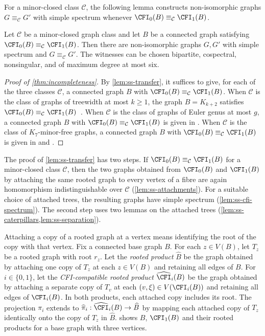 For a minor-closed class $\mathcal C$, the following lemma constructs
non-isomorphic graphs $G\equiv_{\mathcal C}G'$ with simple spectrum
whenever $\CFI_0(B)\equiv_{\mathcal C}\CFI_1(B)$.

\begin{lemma}\label{lem:ss-transfer}
Let $\mathcal C$ be a minor-closed graph class and let $B$ be a connected
graph satisfying $\CFI_0(B)\equiv_{\mathcal C}\CFI_1(B)$. Then there are non-isomorphic
graphs $G,G'$ with simple spectrum and $G\equiv_{\mathcal C}G'$.
The witnesses can be chosen bipartite, cospectral, nonsingular, and of
maximum degree at most six.
\end{lemma}

\begin{proof}[Proof of \cref{thm:incompleteness}]
By \cref{lem:ss-transfer}, it suffices to give, for each of the three
classes $\mathcal C$, a connected graph $B$ with
$\CFI_0(B)\equiv_{\mathcal C}\CFI_1(B)$.
When $\mathcal C$ is the class of graphs of treewidth at most $k\geq1$, the graph
$B=K_{k+2}$ satisfies
$\CFI_0(B)\equiv_{\mathcal C}\CFI_1(B)$~\cite[Theorem~10 and Lemma~12]{Neuen2024}.
When $\mathcal C$ is the class of graphs of Euler genus at most $g$, a connected
graph $B$ with $\CFI_0(B)\equiv_{\mathcal C}\CFI_1(B)$ is given in
\cite[Lemma~2.10 and proof of Theorem~1.8]{NeuenSeppelt2026}.
When $\mathcal C$ is the class of $K_7$-minor-free graphs, a connected graph $B$ with
$\CFI_0(B)\equiv_{\mathcal C}\CFI_1(B)$ is given in
\cite[Lemma~2.10 and proof of Theorem~1.9]{NeuenSeppelt2026}
and \cite[Theorem~1.7 and Section~1.3]{ThilikosWiederrecht2024}.
\end{proof}

The proof of \cref{lem:ss-transfer} has two steps.
If $\CFI_0(B)\equiv_{\mathcal C}\CFI_1(B)$ for a minor-closed class
$\mathcal C$, then the two graphs obtained from $\CFI_0(B)$ and
$\CFI_1(B)$ by attaching the same rooted graph to every vertex of a
fibre are again homomorphism indistinguishable over $\mathcal C$
(\cref{lem:ss-attachments}).
For a suitable choice of attached trees, the resulting graphs have
simple spectrum (\cref{lem:ss-cfi-spectrum}).
The second step uses two lemmas on the attached trees
(\cref{lem:ss-caterpillars,lem:ss-separation}).

Attaching a copy of a rooted graph at a vertex means identifying the
root of the copy with that vertex.
Fix a connected base graph $B$.
For each $z\in V(B)$, let $T_z$ be a rooted graph with root $r_z$.
Let the \emph{rooted product} $\widehat B$ be the graph obtained by
attaching one copy of $T_z$ at each $z\in V(B)$
and retaining all edges of $B$.
For $i\in\{0,1\}$, let the \emph{CFI-compatible rooted product}
$\widehat{\CFI}_i(B)$ be the graph obtained by attaching a separate copy
of $T_v$ at each $(v,\xi)\in V(\CFI_i(B))$ and retaining all edges of $\CFI_i(B)$.
In both products, each attached copy includes its root.
The projection $\pi_i$ extends to
$\widehat\pi_i:\widehat{\CFI}_i(B)\to\widehat B$ by mapping
each attached copy of $T_z$ identically onto the copy of $T_z$ in $\widehat B$.
 shows $B$, $\CFI_1(B)$ and their rooted
products for a base graph with three vertices.

